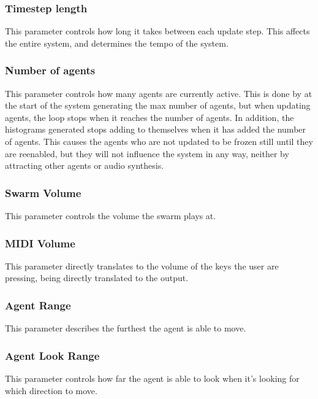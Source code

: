 \documentclass[a4paper,english]{report}
\begin{document}
	\subsubsection{Timestep length}
	This parameter controls how long it takes between each update step. This affects the entire system, and determines the tempo of the system. 
	
	\subsubsection{Number of agents}
	This parameter controls how many agents are currently active. This is done by at the start of the system generating the max number of agents, but when updating agents, the loop stops when it reaches the number of agents. In addition, the histograms generated stops adding to themselves when it has added the number of agents. This causes the agents who are not updated to be frozen still until they are reenabled, but they will not influence the system in any way, neither by attracting other agents or audio synthesis.
	
	\subsubsection{Swarm Volume}
	This parameter controls the volume the swarm plays at.
	
	\subsubsection{MIDI Volume}
	This parameter directly translates to the volume of the keys the user are pressing, being directly translated to the output. 
	
	\subsubsection{Agent Range}
	This parameter describes the furthest the agent is able to move. 
	
	\subsubsection{Agent Look Range}
	This parameter controls how far the agent is able to look when it's looking for which direction to move.
	
\end{document}

